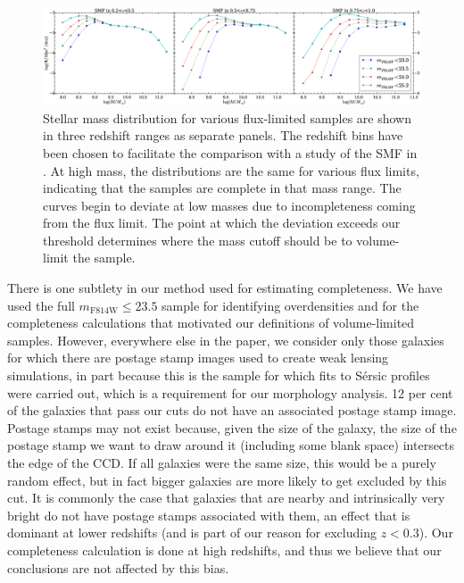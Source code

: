 \documentclass[twocolumn,useAMS,usenatbib]{mn2e}
\newcommand{\sersic}{S\'{e}rsic }
\begin{document}
\begin{figure}
 \centering
 \includegraphics[width=2.2\columnwidth]{SMF}
 \caption{Stellar mass distribution for various flux-limited samples
   are shown in three redshift ranges as separate panels. The redshift
   bins have been chosen to facilitate the comparison with  
          a study of the SMF in \protect\cite{Tomczak_SMF}. At high mass, the
          distributions are the same for various flux limits,
          indicating that the samples are complete in that mass
          range. The curves begin to deviate at low masses due to
          incompleteness coming from the flux limit.  The point at
          which the deviation exceeds our threshold determines where the mass cutoff should be to volume-limit the sample.
          }
 \label{fig:smf}
\end{figure}

There is one subtlety in our method used for estimating
completeness. We have used the full $m_\text{F814W}\le23.5$ sample
for identifying
overdensities and for the completeness calculations that motivated our
definitions of volume-limited samples.  However, everywhere else in the paper, we consider only those galaxies for which there are postage stamp
images used to create weak lensing simulations, in part because this is the
sample for which fits to \sersic profiles were carried out, which is a
requirement for our morphology analysis.  
12 per cent of the galaxies that pass our cuts do not have an
associated postage stamp image.
Postage stamps may not exist because, given the size of the galaxy,
the size of the postage stamp we want to draw around it (including
some blank space) intersects the edge of the CCD.
If all galaxies were the same size, this would be a purely random effect, but in fact bigger galaxies are more likely to get excluded by this cut. 
It is commonly the case that  galaxies that are nearby and
intrinsically very bright do not have postage stamps associated with
them, an effect that is dominant at lower redshifts (and is part of
our reason for excluding $z<0.3$). 
Our completeness calculation is done at high redshifts, and thus we
believe that our conclusions are not affected by this bias.  
\end{document}

